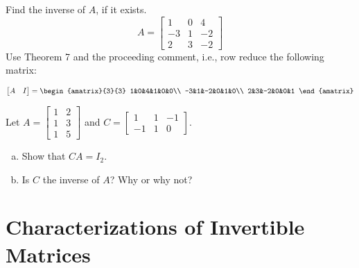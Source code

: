 \begin{exercise} %
	Find the inverse of $A$, if it exists.
	$$ A = \begin{bmatrix}1&0&4\\-3&1&-2\\2&3&-2\end{bmatrix} $$
	Use Theorem 7 and the proceeding comment, i.e., row reduce the following matrix:\par
	\vspace{1em}
	$\begin{bmatrix}A&I\end{bmatrix} = 
	\begin{amatrix}{3}{3}
		1&0&4&1&0&0\\
		-3&1&-2&0&1&0\\
		2&3&-2&0&0&1
	\end{amatrix}$
\end{exercise}
\vfill


\begin{exercise} %
	Let $A=\begin{bmatrix}1&2\\1&3\\1&5\end{bmatrix}$ and $C=\begin{bmatrix}1&1&-1\\-1&1&0\end{bmatrix}$.
	\begin{enumerate}[(a)]
		\item Show that $CA=I_2$.
		\vfill
		\item Is $C$ the inverse of $A$? Why or why not?
		\vspace{2em}
	\end{enumerate}
\end{exercise}


\newpage


\section{Characterizations of Invertible Matrices}
\name[1.5in]

